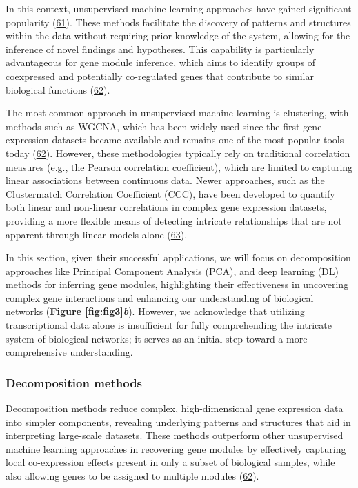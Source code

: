 In this context, unsupervised machine learning approaches have gained significant popularity (\protect\hyperlink{ref-Ko8gMp8P}{61}).
These methods facilitate the discovery of patterns and structures within the data without requiring prior knowledge of the system, allowing for the inference of novel findings and hypotheses.
This capability is particularly advantageous for gene module inference, which aims to identify groups of coexpressed and potentially co-regulated genes that contribute to similar biological functions (\protect\hyperlink{ref-1BVbSrr6M}{62}).

The most common approach in unsupervised machine learning is clustering, with methods such as WGCNA, which has been widely used since the first gene expression datasets became available and remains one of the most popular tools today (\protect\hyperlink{ref-1BVbSrr6M}{62}).
However, these methodologies typically rely on traditional correlation measures (e.g., the Pearson correlation coefficient), which are limited to capturing linear associations between continuous data.
Newer approaches, such as the Clustermatch Correlation Coefficient (CCC), have been developed to quantify both linear and non-linear correlations in complex gene expression datasets, providing a more flexible means of detecting intricate relationships that are not apparent through linear models alone (\protect\hyperlink{ref-YgLIM2bZ}{63}).

In this section, given their successful applications, we will focus on decomposition approaches like Principal Component Analysis (PCA), and deep learning (DL) methods for inferring gene modules, highlighting their effectiveness in uncovering complex gene interactions and enhancing our understanding of biological networks (\textbf{Figure \ref{fig:fig3}\emph{b}}).
However, we acknowledge that utilizing transcriptional data alone is insufficient for fully comprehending the intricate system of biological networks; it serves as an initial step toward a more comprehensive understanding.

\hypertarget{decomposition-methods}{%
\subsubsection{Decomposition methods}\label{decomposition-methods}}

Decomposition methods reduce complex, high-dimensional gene expression data into simpler components, revealing underlying patterns and structures that aid in interpreting large-scale datasets.
These methods outperform other unsupervised machine learning approaches in recovering gene modules by effectively capturing local co-expression effects present in only a subset of biological samples, while also allowing genes to be assigned to multiple modules (\protect\hyperlink{ref-1BVbSrr6M}{62}).

